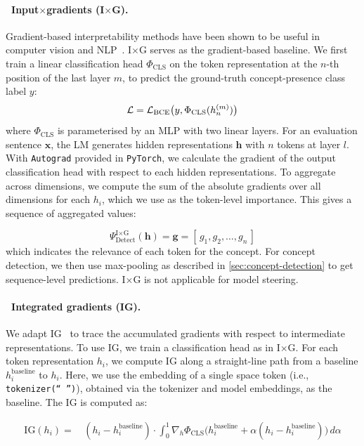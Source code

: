 \documentclass{article}
\theoremstyle{plain}
\theoremstyle{definition}
\theoremstyle{remark}
\renewcommand{\cite}{\citep}
\newcommand{\methodtag}[2]{%
  \tikz[baseline=(char.base)]{%
    \node[
      fill=#1,
      rounded corners=2pt,
      text=white,
      font=\bfseries,
      minimum width=1em,
      minimum height=1em,
      align=center,
      inner sep=0pt
    ](char){#2};%
  }%
}
\newcommand{\concepttag}{\protect\methodtag{conceptcolor}{C}}
\begin{document}
\paragraph{\concepttag\ Input$\times$gradients (I$\times$G).} Gradient-based interpretability methods have been shown to be useful in computer vision and NLP~\cite{integratedgradient, wallace2019allennlp}. I$\times$G serves as the gradient-based baseline. We first train a linear classification head $\Phi_{\text{CLS}}$ on the token representation at the $n$-th position of the last layer $m$, to predict the ground-truth concept-presence class label $y$:
\begin{equation}
{\mathcal{L}} = {\mathcal{L}}_{\text{BCE}}\bigl(y, \Phi_{\text{CLS}}(h_{n}^{(m)})\bigr)
\end{equation}
where $\Phi_{\text{CLS}}$ is parameterised by an MLP with two linear layers. For an evaluation sentence \(\mathbf{x}\), the LM generates hidden representations \(\mathbf{h}\) with $n$ tokens at layer $l$. With \texttt{Autograd} provided in \texttt{PyTorch}, we calculate the gradient of the output classification head with respect to each hidden representations. To aggregate across dimensions, we compute the sum of the absolute gradients over all dimensions for each \(h_i\), which we use as the token-level importance. This gives a sequence of aggregated values:

\[
\Psi_{\text{Detect}}^{\text{I}\times\text{G}}(\mathbf{h}) = \mathbf{g} = [\,g_1, g_2, \ldots, g_n\,]
\]
which indicates the relevance of each token for the concept. For concept detection, we then use max-pooling as described in \cref{sec:concept-detection} to get sequence-level predictions. I$\times$G is not applicable for model steering.


\paragraph{\concepttag\ Integrated gradients (IG).} We adapt IG~\cite{integratedgradient} to trace the accumulated gradients with respect to intermediate representations. To use IG, we train a classification head as in I$\times$G. For each token representation \(h_i\), we compute IG along a straight-line path from a baseline \(h_i^{\text{baseline}}\) to \(h_i\). Here, we use the embedding of a single space token (i.e., \texttt{tokenizer(`` '')}), obtained via the tokenizer and model embeddings, as the baseline. The IG is computed as:

\begin{align*}
\text{IG}(h_i) = & \, (h_i - h_i^{\text{baseline}}) \cdot \int_{0}^{1} 
\nabla_h \Phi_{\text{CLS}} \bigl(h_i^{\text{baseline}} + \alpha (h_i - h_i^{\text{baseline}}) \bigr) \, d\alpha
\end{align*}
\end{document}
